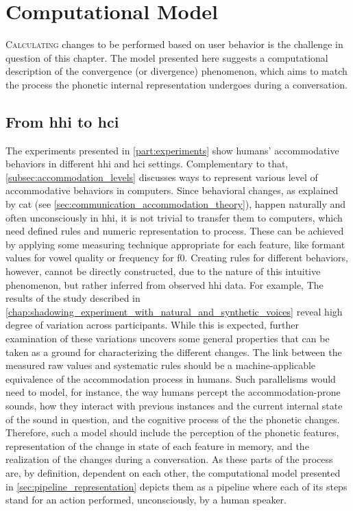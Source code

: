 \chapter[Computational Model]{Computational Model}
\label{chap:computational_model}

\lettrine{C}{alculating} changes to be performed based on user behavior is the challenge in question of this chapter.
The model presented here suggests a computational description of the convergence (or divergence) phenomenon, which aims to match the process the phonetic internal representation undergoes during a conversation.

\pagebreak

\section{From \acs{hhi} to \acs{hci}}
\label{sec:from_hhi_to_hci}

The experiments presented in \cref{part:experiments} show humans' accommodative behaviors in different \ac{hhi} and \ac{hci} settings.
Complementary to that, \cref{subsec:accommodation_levels} discusses ways to represent various level of accommodative behaviors in computers.
Since behavioral changes, as explained by \ac{cat} (see \cref{sec:communication_accommodation_theory}), happen naturally and often unconsciously in \ac{hhi}, it is not trivial to transfer them to computers, which need defined rules and numeric representation to process.
These can be achieved by applying some measuring technique appropriate for each feature, like formant values for vowel quality or frequency for \ac{f0}.
Creating rules for different behaviors, however, cannot be directly constructed, due to the nature of this intuitive phenomenon, but rather inferred from observed \ac{hhi} data.
For example, The results of the study described in \cref{chap:shadowing_experiment_with_natural_and_synthetic_voices} reveal high degree of variation across participants.
While this is expected, further examination of these variations uncovers some general properties that can be taken as a ground for characterizing the different changes.
The link between the measured raw values and systematic rules should be a machine-applicable equivalence of the accommodation process in humans.
Such parallelisms would need to model, for instance, the way humans percept the accommodation-prone sounds, how they interact with previous instances and the current internal state of the sound in question, and the cognitive process of the the phonetic changes.
Therefore, such a model should include the perception of the phonetic features, representation of the change in state of each feature in memory, and the realization of the changes during a conversation.
As these parts of the process are, by definition, dependent on each other, the computational model presented in \cref{sec:pipeline_representation} depicts them as a pipeline where each of its steps stand for an action performed, unconsciously, by a human speaker.

